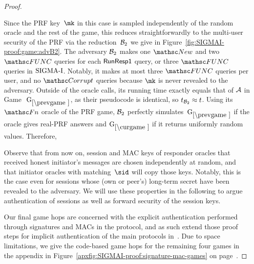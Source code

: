 \begin{proof}
\begin{collectinmacro}{\SIGMIProofPRF}{}{}
\begin{figure}[t]
  	\iffull\else %
	\label{apxfig:SIGMAI-proof:PRF}
	\fi
\end{figure}
\end{collectinmacro}

\iffull %
\SIGMIProofPRF
\fi

Since the PRF key~$\mk$ in this case is sampled independently of the random oracle and the rest of the game,
this reduces straightforwardly to the multi-user security
of the PRF via the reduction~$\mathcal{B}_2$ we give in Figure~\ref{fig:SIGMAI-proof:game:advB2}.
The adversary $\mathcal{B}_2$ makes one $\New$ and two $\FUNC$ queries for each $\mathsf{RunResp1}$ query, or three $\FUNC$ queries in $\mbox{SIGMA-I}$. Notably, it makes at most three $\FUNC$ queries per user, and no $\Corrupt$ queries because $\mk$ is never revealed to the adversary. Outside of the oracle calls, its running time exactly equals that of $\mathcal{A}$ in Game $~\prevGm$, as their pseudocode is identical, so $t_{\mathcal{B}_2}\approx t$. 
Using its~$\procfont{Fn}$ oracle of the PRF game, $\mathcal{B}_2$ perfectly simulates~$\prevGm$ if the oracle gives real-PRF answers and $\curGm$ if it returns uniformly random values.
Therefore,

Observe that from now on, session and MAC keys of responder oracles that received honest initiator's messages are chosen independently at random,
and that initiator oracles with matching~$\sid$ will copy those keys.
Notably, this is the case even for sessions whose (own or peer's) long-term secret have been revealed to the adversary.
We will use these properties in the following to argue authentication of sessions
as well as forward security of the session keys.

\medskip

Our final game hops are concerned with the explicit authentication performed through signatures and MACs in the \SIGMAI protocol,
and as such extend those proof steps for implicit authentication of the main protocols in~\cite{C:CCGJJ19}.
\iffull\else
Due to space limitations, we give the code-based game hops for the remaining four games in the appendix in Figure~\ref{apxfig:SIGMAI-proof:signature-mac-games} on page~\pageref{apxfig:SIGMAI-proof:signature-mac-games}.
\fi



\end{proof}
